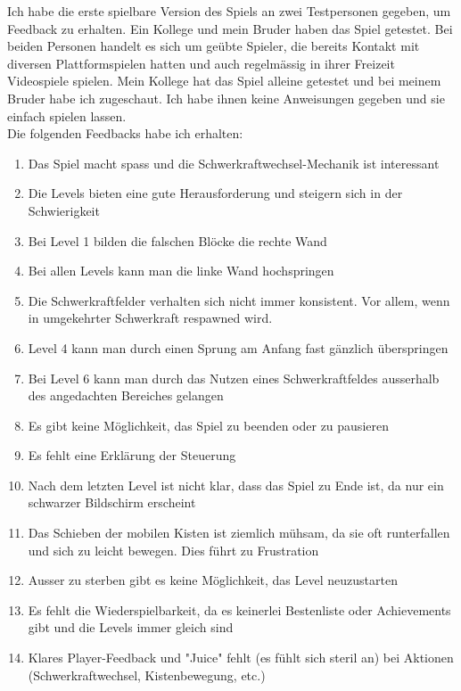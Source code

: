 \documentclass{article}
\begin{document}
Ich habe die erste spielbare Version des Spiels an zwei Testpersonen gegeben, um Feedback zu erhalten. Ein Kollege und mein Bruder haben das Spiel getestet.
Bei beiden Personen handelt es sich um geübte Spieler, die bereits Kontakt mit diversen Plattformspielen hatten und auch regelmässig in ihrer Freizeit Videospiele spielen.
Mein Kollege hat das Spiel alleine getestet und bei meinem Bruder habe ich zugeschaut. Ich habe ihnen keine Anweisungen gegeben und sie einfach spielen lassen.
\\
Die folgenden Feedbacks habe ich erhalten:
\begin{enumerate}
    \item Das Spiel macht spass und die Schwerkraftwechsel-Mechanik ist interessant
    \item Die Levels bieten eine gute Herausforderung und steigern sich in der Schwierigkeit
    \item Bei Level 1 bilden die falschen Blöcke die rechte Wand
    \item Bei allen Levels kann man die linke Wand hochspringen
    \item Die Schwerkraftfelder verhalten sich nicht immer konsistent. Vor allem, wenn in umgekehrter Schwerkraft respawned wird.
    \item Level 4 kann man durch einen Sprung am Anfang fast gänzlich überspringen
    \item Bei Level 6 kann man durch das Nutzen eines Schwerkraftfeldes ausserhalb des angedachten Bereiches gelangen
    \item Es gibt keine Möglichkeit, das Spiel zu beenden oder zu pausieren
    \item Es fehlt eine Erklärung der Steuerung
    \item Nach dem letzten Level ist nicht klar, dass das Spiel zu Ende ist, da nur ein schwarzer Bildschirm erscheint
    \item Das Schieben der mobilen Kisten ist ziemlich mühsam, da sie oft runterfallen und sich zu leicht bewegen. Dies führt zu Frustration
    \item Ausser zu sterben gibt es keine Möglichkeit, das Level neuzustarten
    \item Es fehlt die Wiederspielbarkeit, da es keinerlei Bestenliste oder Achievements gibt und die Levels immer gleich sind
    \item Klares Player-Feedback und "Juice" fehlt (es fühlt sich steril an) bei Aktionen (Schwerkraftwechsel, Kistenbewegung, etc.)
\end{enumerate}
\end{document}
